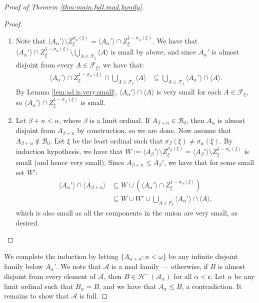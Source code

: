 \documentclass[11pt,reqno]{amsart}
\theoremstyle{plain}
\numberwithin{equation}{section}
\theoremstyle{definition}
\renewcommand{\c}[1]{\langle #1 \rangle}
\newcommand{\F}{\cal{F}}
\newcommand{\cal}{\mathcal}
\renewcommand{\frak}{\mathfrak}
\newcommand{\A}{\cal{A}}
\newcommand{\B}{\cal{B}}
\renewcommand{\H}{\cal{H}}
\newenvironment{midproof}[1][Proof]
  {\begin{proof}[#1]\renewcommand{\qedsymbol}{$\blacksquare$}}
  {\end{proof}}
\begin{document}
\begin{proof}[Proof of Theorem \ref{thm:main.full.mad.family}]
    \begin{midproof}
        \hfill
        \begin{enumerate}
            \item Note that $\c{A_\alpha'} \setminus Z_\xi^{\sigma_\alpha(\xi)} = \c{A_\alpha'} \cap Z_\xi^{1-\sigma_\alpha(\xi)}$. We have that $\c{A_\alpha'} \cap Z_\xi^{1 - \sigma_\alpha(\xi)} \setminus \bigcup_{A \in \F_\xi} \c{A}$ is small by above, and since $A_\alpha'$ is almost disjoint from every $A \in \F_\xi$, we have that:
            \begin{align*}
                \c{A_\alpha'} \cap Z_\xi^{1 - \sigma_\alpha(\xi)} \cap \bigcup_{A \in \F_\xi} \c{A} &\subseteq \bigcup_{A \in \F_\xi} \c{A_\alpha'} \cap \c{A}.
            \end{align*}
            By Lemma \ref{lem:ad.is.very.small}, $\c{A_\alpha'} \cap \c{A}$ is very small for each $A \in \F_\xi$, so $\c{A_\alpha'} \cap Z_\xi^{1-\sigma_\alpha(\xi)}$ is small. 

            \item Let $\beta + n < \alpha$, where $\beta$ is a limit ordinal. If $A_{\beta+n} \in \B_0$, then $A_\alpha$ is almost disjoint from $A_{\beta+n}$ by construction, so we are done. Now assume that $A_{\beta+n} \notin \B_0$. Let $\xi$ be the least ordinal such that $\sigma_\beta(\xi) \neq \sigma_\alpha(\xi)$. By induction hypothesis, we have that $W := \c{A_\beta'} \setminus Z_\xi^{\sigma_\beta(\xi)} = \c{A_\beta'} \setminus Z_\xi^{1-\sigma_\alpha(\xi)}$ is small (and hence very small). Since $A_{\beta+n} \leq A_\beta'$, we have that for some small set $W'$:
            \begin{align*}
                \c{A_\alpha'} \cap \c{A_{\beta+n}} &\subseteq W \cup (\c{A_\alpha'} \cap Z_\xi^{1-\sigma_\alpha(\xi)}) \\
                &\subseteq W \cup W' \cup \bigcup_{A \in F_\xi} \c{A_\alpha'} \cap \c{A},
            \end{align*}
            which is also small as all the components in the union are very small, as desired.
        \end{enumerate}
    \end{midproof}
    We complete the induction by letting $\{A_{\alpha+n} : n < \omega\}$ be any infinite disjoint family below $A_\alpha'$. We note that $\A$ is a mad family --- otherwise, if $B$ is almost disjoint from every element of $\A$, then $B \in \H^-(\A_\alpha)$ for all $\alpha < \frak{c}$. Let $\alpha$ be any limit ordinal such that $B_\alpha = B$, and we have that $A_\alpha \leq B$, a contradiction. It remains to show that $\A$ is full.
    

\end{proof}
\end{document}
